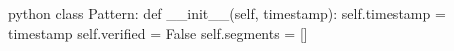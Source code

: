 \begin{mintedbox}[samepage]{python}
class Pattern:
    def __init__(self, timestamp):
        self.timestamp = timestamp
        self.verified = False
        self.segments = []
\end{mintedbox}